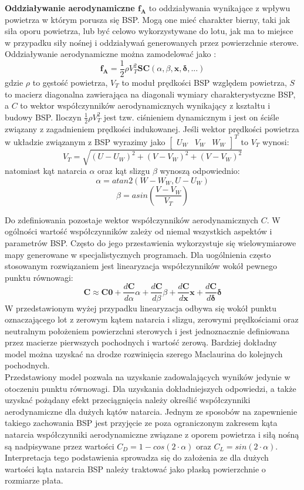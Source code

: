 \textbf{Oddziaływanie aerodynamiczne $\bm{f_A}$} to oddziaływania wynikające z wpływu powietrza w którym porusza się BSP. Mogą one mieć charakter bierny, taki jak siła oporu powietrza, lub być celowo wykorzystywane do lotu, jak ma to miejsce w przypadku siły nośnej i oddziaływań generowanych przez powierzchnie sterowe. Oddziaływanie aerodynamiczne można zamodelować jako \cite{solar_plane}:
\[
	\bm{f_A} = \frac{1}{2}\rho V_{T}^2  \bm{S} \bm{C}\left(\alpha, \beta, \bm{x}, \bm{\delta}, ... \right)
\]
gdzie $\rho$ to gęstość powietrza, $V_T$ to moduł prędkości BSP względem powietrza, $S$ to macierz diagonalna zawierająca na diagonali wymiary charakterystyczne BSP, a $C$ to wektor współczynników aerodynamicznych wynikający z kształtu i budowy BSP. Iloczyn $\frac{1}{2}\rho V_{T}^2$ jest tzw. ciśnieniem dynamicznym i jest on ściśle związany z zagadnieniem prędkości indukowanej. Jeśli wektor prędkości powietrza w układzie związanym z BSP wyrazimy jako $ \begin{bmatrix} U_W & V_W & W_W\end{bmatrix}^T$ to $V_T$ wynosi:
\[
	V_T = \sqrt{(U-U_W)^2 + (V-V_W)^2 + (V-V_W)^2}
\]
natomiast kąt natarcia $\alpha$ oraz kąt slizgu $\beta$ wynoszą odpowiednio:
\[
	\alpha = atan2 \left( W - W_W, U - U_W \right)
\]
\[
	\beta = asin \left( \frac{V-V_W}{V_T} \right)
\]

Do zdefiniowania pozostaje wektor współczynników aerodynamicznych $C$. W ogólności wartość współczynników zależy od niemal wszystkich aspektów i parametrów BSP. Często do jego przestawienia wykorzystuje się wielowymiarowe mapy generowane w specjalistycznych programach. Dla uogólnienia często stosowanym rozwiązaniem jest linearyzacja współczynników wokół pewnego punktu równowagi:
\[
\bm{C} \approx \bm{C0} + \frac{d\bm{C}}{d\alpha}\alpha + \frac{d\bm{C}}{d\beta}\beta + \frac{d\bm{C}}{d\bm{x}}\bm{x} + \frac{d\bm{C}}{d\bm{\delta}}\bm{\delta}
\]
W przedstawionym wyżej przypadku linearyzacja odbywa się wokół punktu oznaczającego lot z zerowym kątem natarcia i slizgu, zerowymi prędkościami oraz neutralnym położeniem powierzchni sterowych i jest jednoznacznie definiowana przez macierze pierwszych pochodnych i wartość zerową. Bardziej dokładny model można uzyskać na drodze rozwinięcia szerego Maclaurina do kolejnych pochodnych.\\

Przedstawiony model pozwala na uzyskanie zadowalających wyników jedynie w otoczeniu punktu równowagi. Dla uzyskania dokładniejszych odpowiedzi, a także uzyskać pożądany efekt przeciągnięcia należy określić współczynniki aerodynamiczne dla dużych kątów natarcia. Jednym ze sposobów na zapewnienie takiego zachowania BSP jest przyjęcie ze poza ograniczonym zakresem kąta natarcia współczynniki aerodynamiczne związane z oporem powietrza i siłą nośną są nadpisywane przez wartości $C_D = 1 - cos(2 \cdot \alpha)$ oraz $C_L = sin(2 \cdot \alpha)$. Interpretacja tego podstawienia sprowadza się do założenia ze dla dużych wartości kąta natarcia BSP należy traktować jako płaską powierzchnie o rozmiarze płata.\\



